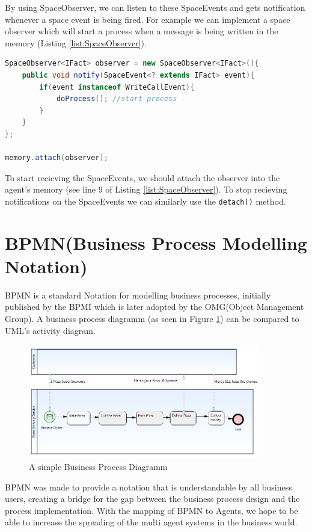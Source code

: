 By using SpaceObserver, we can listen to these SpaceEvents and gets notification whenever a space event is being fired.
For example we can implement a space observer which will start a process when a message is being written in the memory (Listing \ref{list:SpaceObserver}). 
\begin{lstlisting}[language = Java, caption = A SpaceObserver, label = list:SpaceObserver]
SpaceObserver<IFact> observer = new SpaceObserver<IFact>(){
	public void notify(SpaceEvent<? extends IFact> event){
		if(event instanceof WriteCallEvent){
			doProcess(); //start process
		}
	}
};

memory.attach(observer);
\end{lstlisting}

To start recieving the SpaceEvents, we should attach the observer into the agent's memory (see line 9 of Listing \ref{list:SpaceObserver}). To stop recieving notifications on the SpaceEvents we can similarly use the \texttt{detach()} method.

\newpage
\section{BPMN(Business Process Modelling Notation)}
BPMN \cite{BPMN2} is a standard Notation for modelling business processes, initially published by the BPMI which is later adopted by the OMG(Object Management Group). A business process diagramm (as seen in Figure \ref{fig:bpmn_sampl}) can be compared to UML's activity diagram.\\
\begin{figure}[h]
	\centering
		\includegraphics[width=0.90\textwidth]{images/bpmn_sampl.png}
	\caption{A simple Business Process Diagramm}
	\label{fig:bpmn_sampl}
\end{figure}

BPMN was made to provide a notation that is understandable by all business users, creating a bridge for the gap between the business process design and the process implementation. With the mapping of BPMN to Agents, we hope to be able to increase the spreading of the multi agent systems in the business world.


